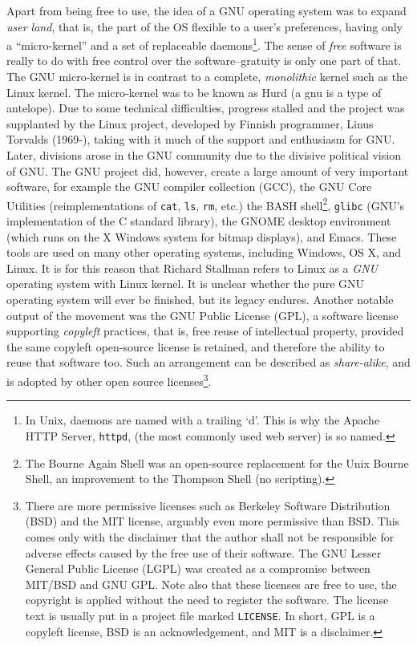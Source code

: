\documentclass[11pt]{amsart}
\begin{document}
Apart from being free to use, the idea of a GNU operating system was to expand \emph{user land}, that is, the part of the OS flexible to a user's preferences, having only a ``micro-kernel'' and a set of replaceable daemons\footnote{In Unix, daemons are named with a trailing `d'. This is why the Apache HTTP Server, \texttt{httpd}, (the most commonly used web server) is so named.}. The sense of \emph{free} software is really to do with free control over the software--gratuity is only one part of that. The GNU micro-kernel is in contrast to a complete, \emph{monolithic} kernel such as the Linux kernel. The micro-kernel was to be known as Hurd (a gnu is a type of antelope). Due to some technical difficulties, progress stalled and the project was supplanted by the Linux project, developed by Finnish programmer, Linus Torvalds (1969-), taking with it much of the support and enthusiasm for GNU. Later, divisions arose in the GNU community due to the divisive political vision of GNU. The GNU project did, however, create a large amount of very important software, for example the GNU compiler collection (GCC), the GNU Core Utilities (reimplementations of \texttt{cat}, \texttt{ls}, \texttt{rm}, etc.) the BASH shell\footnote{The Bourne Again Shell was an open-source replacement for the Unix Bourne Shell, an improvement to the Thompson Shell (no scripting).}, \texttt{glibc} (GNU's implementation of the C standard library), the GNOME desktop environment (which runs on the X Windows system for bitmap displays), and Emacs. These tools are used on many other operating systems, including Windows, OS X, and Linux. It is for this reason that Richard Stallman refers to Linux as a \emph{GNU} operating system with Linux kernel. It is unclear whether the pure GNU operating system will ever be finished, but its legacy endures. Another notable output of the movement was the GNU Public License (GPL), a software license supporting \emph{copyleft} practices, that is, free reuse of intellectual property, provided the same copyleft open-source license is retained, and therefore the ability to reuse that software too. Such an arrangement can be described as \emph{share-alike}, and is adopted by other open source licenses\footnote{There are more permissive licenses such as Berkeley Software Distribution (BSD) and the MIT license, arguably even more permissive than BSD. This comes only with the disclaimer that the author shall not be responsible for adverse effects caused by the free use of their software. The GNU Lesser General Public License (LGPL) was created as a compromise between MIT/BSD and GNU GPL. Note also that these licenses are free to use, the copyright is applied without the need to register the software. The license text is usually put in a project file marked \texttt{LICENSE}. In short, GPL is a copyleft license, BSD is an acknowledgement, and MIT is a disclaimer.}.
\end{document}
